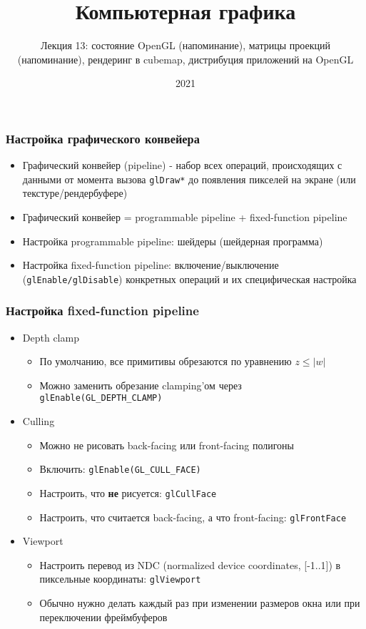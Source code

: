 \documentclass{beamer}
\title{Компьютерная графика}
\subtitle{Лекция 13: состояние OpenGL (напоминание), матрицы проекций (напоминание), рендеринг в cubemap, дистрибуция приложений на OpenGL}
\date{2021}
\begin{document}
\frame{\titlepage}

\begin{frame}[fragile]
\frametitle{Настройка графического конвейера}
\begin{itemize}
\item Графический конвейер (pipeline) - набор всех операций, происходящих с данными от момента вызова \verb|glDraw*| до появления пикселей на экране (или текстуре/рендербуфере)
\pause
\item Графический конвейер = programmable pipeline + fixed-function pipeline
\pause
\item Настройка programmable pipeline: шейдеры (шейдерная программа)
\pause
\item Настройка fixed-function pipeline: включение/выключение (\verb|glEnable/glDisable|) конкретных операций и их специфическая настройка
\end{itemize}
\end{frame}

\begin{frame}[fragile]
\frametitle{Настройка fixed-function pipeline}
\begin{itemize}
\item Depth clamp
\begin{itemize}
\item По умолчанию, все примитивы обрезаются по уравнению \begin{math}z \leq |w|\end{math}
\item Можно заменить обрезание clamping'ом через \verb|glEnable(GL_DEPTH_CLAMP)|
\end{itemize}
\pause
\item Culling
\begin{itemize}
\item Можно не рисовать back-facing или front-facing полигоны
\item Включить: \verb|glEnable(GL_CULL_FACE)|
\item Настроить, что \textbf{не} рисуется: \verb|glCullFace|
\item Настроить, что считается back-facing, а что front-facing: \verb|glFrontFace|
\end{itemize}
\pause
\item Viewport
\begin{itemize}
\item Настроить перевод из NDC (normalized device coordinates, [-1..1]) в пиксельные координаты: \verb|glViewport|
\item Обычно нужно делать каждый раз при изменении размеров окна или при переключении фреймбуферов
\end{itemize}
\end{itemize}
\end{frame}
\end{document}

